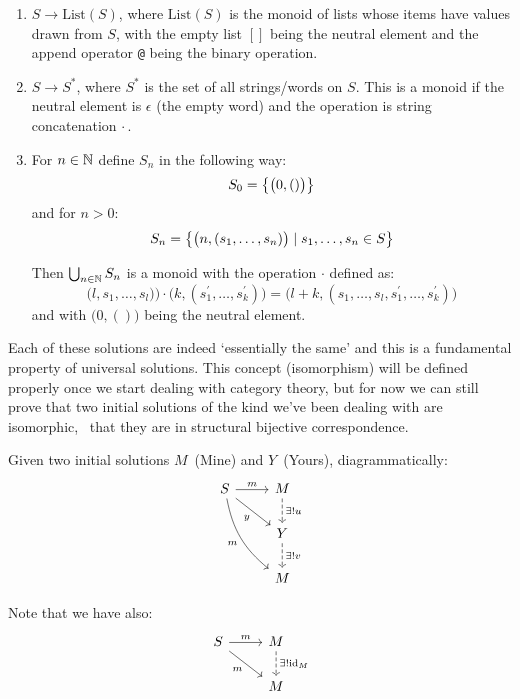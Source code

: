 \begin{enumerate}

\item $S \to \mathrm{List}(S)$, where $\mathrm{List}(S)$ is the monoid of lists
whose items have values drawn from $S$, with the empty list $[]$ being the
neutral element and the append operator \texttt{@} being the binary
operation.

\item $S \to S^\ast$, where $S^\ast$ is the set of all strings/words on $S$.
This is a monoid if the neutral element is $\epsilon$ (the empty word) and the
operation is string concatenation $\cdot$\,.

\item For $n \in \mathbb{N}$ define $S_n$ in the following way:
\[
S_0 = \big\{  \big(0, ()\big)  \big\}
\]
and for $n > 0$:
\[
S_n
= \big\{ \big(n, (s_1, \ldots, s_n)\big) \mid s_1, \ldots, s_n \in S \big\}
\]

Then $\bigcup_{n\in\mathbb{N}} S_n$ is a monoid with the operation $\cdot$ defined
as:
\[
\big(l, s_1, \ldots, s_l)\big)
\cdot
\big(k, (s_1^\prime, \ldots, s_k^\prime)\big)
=
\big(l + k, (s_1, \ldots, s_l, s_1^\prime, \ldots, s_k^\prime)\big)
\]
and with $\big(0, ()\big)$ being the neutral element.

\end{enumerate}

Each of these solutions are indeed `essentially the same' and this is a
fundamental property of universal solutions. This concept (isomorphism)
will be defined properly once we start dealing with category theory, but for
now we can still prove that two initial solutions of the kind we've been
dealing with are isomorphic, \ie~that they are in structural bijective
correspondence.

Given two initial solutions $M$~(Mine) and $Y$~(Yours), diagrammatically:
$$
\begin{tikzcd}
    S \arrow[r, "m"] \arrow[rd, swap, "y"]
    \arrow[rdd, swap, bend right = 20, "m"] &
    M \arrow[d, dashed, "\exists! u"] \\
    {} & Y \arrow[d, dashed, "\exists! v"] \\
    {} & M
\end{tikzcd}
$$

Note that we have also:
$$
\begin{tikzcd}
    S \arrow[r, "m"] \arrow[rd, swap, "m"] &
    M \arrow[d, dashed, "\exists! \id{M}"] \\
    {} & M
\end{tikzcd}
$$

